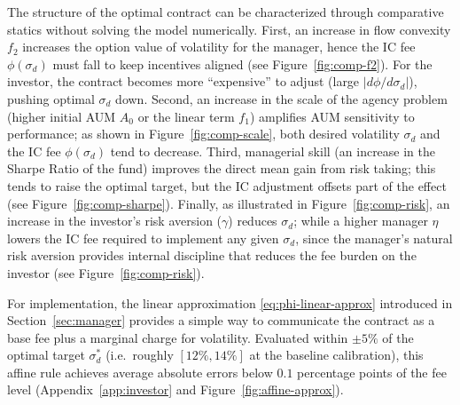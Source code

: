 The structure of the optimal contract can be characterized through comparative statics without solving the model numerically. First, an increase in flow convexity $f_2$ increases the option value of volatility for the manager, hence the IC fee \(\phi(\sigma_d)\) must fall to keep incentives aligned (see Figure~\ref{fig:comp-f2}). For the investor, the contract becomes more ``expensive'' to adjust (large \(|d\phi/d\sigma_d|\)), pushing optimal \(\sigma_d\) down. Second, an increase in the scale of the agency problem (higher initial AUM $A_0$ or the linear term $f_1$) amplifies AUM sensitivity to performance; as shown in Figure~\ref{fig:comp-scale}, both desired volatility \(\sigma_d\) and the IC fee \(\phi(\sigma_d)\) tend to decrease. Third, managerial skill (an increase in the Sharpe Ratio of the fund) improves the direct mean gain from risk taking; this tends to raise the optimal target, but the IC adjustment offsets part of the effect (see Figure~\ref{fig:comp-sharpe}). Finally, as illustrated in Figure~\ref{fig:comp-risk}, an increase in the investor's risk aversion ($\gamma$) reduces \(\sigma_d\); while a higher manager $\eta$ lowers the IC fee required to implement any given \(\sigma_d\), since the manager's natural risk aversion provides internal discipline that reduces the fee burden on the investor (see Figure~\ref{fig:comp-risk}).

For implementation, the linear approximation \eqref{eq:phi-linear-approx} introduced in Section~\ref{sec:manager} provides a simple way to communicate the contract as a base fee plus a marginal charge for volatility. Evaluated within $\pm 5\%$ of the optimal target $\sigma_d^*$ (i.e.\ roughly $[12\%, 14\%]$ at the baseline calibration), this affine rule achieves average absolute errors below $0.1$ percentage points of the fee level (Appendix~\ref{app:investor} and Figure~\ref{fig:affine-approx}).
